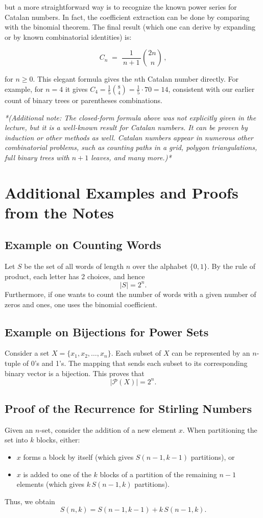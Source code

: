 \documentclass{article}
\begin{document}
but a more straightforward way is to recognize the known power series for Catalan numbers. In fact, the coefficient extraction can be done by comparing with the binomial theorem. The final result (which one can derive by expanding or by known combinatorial identities) is:

\[
C_n \;=\; \frac{1}{\,n+1\,}\binom{2n}{\,n}\,,
\] 

for $n \ge 0$. This elegant formula gives the $n$th Catalan number directly. For example, for $n=4$ it gives $C_4 = \frac{1}{5}\binom{8}{4} = \frac{1}{5}\cdot 70 = 14$, consistent with our earlier count of binary trees or parentheses combinations.

\textit{*(Additional note: The closed-form formula above was not explicitly given in the lecture, but it is a well-known result for Catalan numbers. It can be proven by induction or other methods as well. Catalan numbers appear in numerous other combinatorial problems, such as counting paths in a grid, polygon triangulations, full binary trees with $n+1$ leaves, and many more.)*}



\section*{Additional Examples and Proofs from the Notes}

\subsection*{Example on Counting Words}
Let $S$ be the set of all words of length $n$ over the alphabet $\{0,1\}$. By the rule of product, each letter has 2 choices, and hence
\[
|S| = 2^n.
\]
Furthermore, if one wants to count the number of words with a given number of zeros and ones, one uses the binomial coefficient.

\subsection*{Example on Bijections for Power Sets}
Consider a set $X = \{x_1, x_2, \dots, x_n\}$. Each subset of $X$ can be represented by an $n$-tuple of 0's and 1's. The mapping that sends each subset to its corresponding binary vector is a bijection. This proves that
\[
|\mathcal{P}(X)| = 2^n.
\]

\subsection*{Proof of the Recurrence for Stirling Numbers}
Given an $n$-set, consider the addition of a new element $x$. When partitioning the set into $k$ blocks, either:
\begin{itemize}[nosep]
    \item $x$ forms a block by itself (which gives $S(n-1,k-1)$ partitions), or
    \item $x$ is added to one of the $k$ blocks of a partition of the remaining $n-1$ elements (which gives $k\, S(n-1,k)$ partitions).
\end{itemize}
Thus, we obtain
\[
S(n,k) = S(n-1,k-1) + k\, S(n-1,k).
\]
\end{document}
